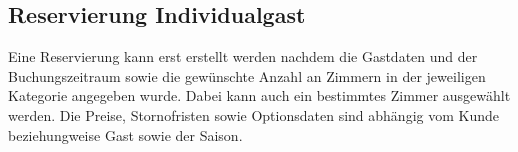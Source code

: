 \documentclass[../SubfileFeatures.tex]{subfiles}
\begin{document}
    \subsection{Reservierung Individualgast}
	Eine Reservierung kann erst erstellt werden nachdem die Gastdaten und der
	Buchungszeitraum sowie die gewünschte Anzahl an Zimmern in der jeweiligen Kategorie
	angegeben wurde. Dabei kann auch ein bestimmtes Zimmer ausgewählt werden.
	Die Preise, Stornofristen sowie Optionsdaten sind abhängig vom Kunde beziehungweise
	Gast sowie der Saison.
\end{document}
